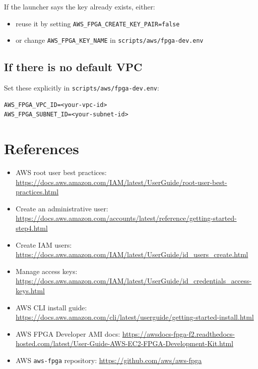 \documentclass[11pt]{article}
\begin{document}
If the launcher says the key already exists, either:

\begin{itemize}
\item reuse it by setting \verb|AWS_FPGA_CREATE_KEY_PAIR=false|
\item or change \verb|AWS_FPGA_KEY_NAME| in \texttt{scripts/aws/fpga-dev.env}
\end{itemize}

\subsection*{If there is no default VPC}

Set these explicitly in \texttt{scripts/aws/fpga-dev.env}:

\begin{verbatim}
AWS_FPGA_VPC_ID=<your-vpc-id>
AWS_FPGA_SUBNET_ID=<your-subnet-id>
\end{verbatim}

\section*{References}

\begin{itemize}
\item AWS root user best practices: \url{https://docs.aws.amazon.com/IAM/latest/UserGuide/root-user-best-practices.html}
\item Create an administrative user: \url{https://docs.aws.amazon.com/accounts/latest/reference/getting-started-step4.html}
\item Create IAM users: \url{https://docs.aws.amazon.com/IAM/latest/UserGuide/id_users_create.html}
\item Manage access keys: \url{https://docs.aws.amazon.com/IAM/latest/UserGuide/id_credentials_access-keys.html}
\item AWS CLI install guide: \url{https://docs.aws.amazon.com/cli/latest/userguide/getting-started-install.html}
\item AWS FPGA Developer AMI docs: \url{https://awsdocs-fpga-f2.readthedocs-hosted.com/latest/User-Guide-AWS-EC2-FPGA-Development-Kit.html}
\item AWS \texttt{aws-fpga} repository: \url{https://github.com/aws/aws-fpga}
\end{itemize}
\end{document}
